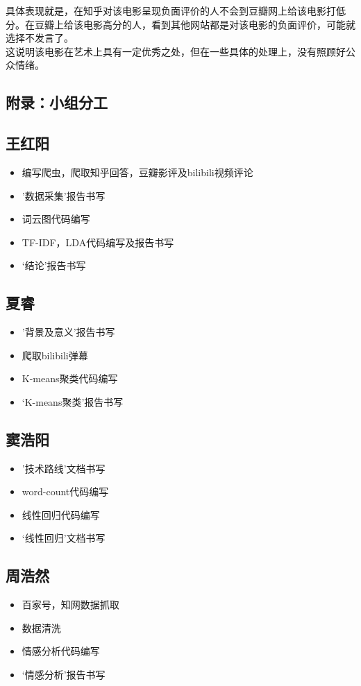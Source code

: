 \documentclass[12pt,a4paper,utf8]{article}
\begin{document}
具体表现就是，在知乎对该电影呈现负面评价的人不会到豆瓣网上给该电影打低分。在豆瓣上给该电影高分的人，看到其他网站都是对该电影的负面评价，可能就选择不发言了。\\

这说明该电影在艺术上具有一定优秀之处，但在一些具体的处理上，没有照顾好公众情绪。




\newpage
\begin{subappendices}  
\section{附录：小组分工} 

\subsection{王红阳}
\begin{itemize}
    \item 编写爬虫，爬取知乎回答，豆瓣影评及bilibili视频评论
    \item '数据采集'报告书写
    \item 词云图代码编写
    \item TF-IDF，LDA代码编写及报告书写
    \item ‘结论’报告书写
\end{itemize}

\subsection{夏睿}
\begin{itemize}
    \item '背景及意义'报告书写
    \item 爬取bilibili弹幕
    \item K-means聚类代码编写
    \item ‘K-means聚类'报告书写
\end{itemize}

\subsection{窦浩阳}
\begin{itemize}
    \item '技术路线'文档书写
    \item word-count代码编写
    \item 线性回归代码编写
    \item ‘线性回归’文档书写
\end{itemize}

\subsection{周浩然}
\begin{itemize}
    \item 百家号，知网数据抓取
    \item 数据清洗
    \item 情感分析代码编写
    \item ‘情感分析’报告书写
\end{itemize}

\end{subappendices}  %
\end{document}
